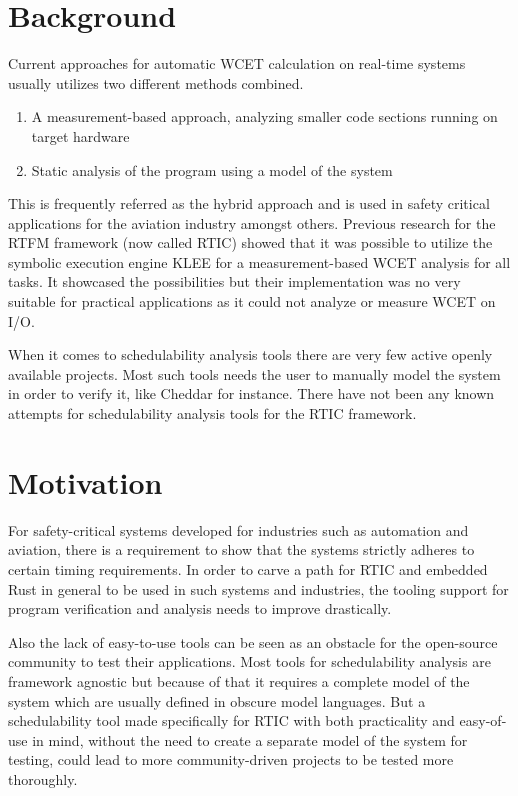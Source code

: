 \section{Background}
Current approaches for automatic WCET calculation on real-time systems usually
utilizes two different methods combined.
\begin{enumerate}
    \item A measurement-based approach, analyzing smaller code sections running
        on target hardware
    \item Static analysis of the program using a model of the system
\end{enumerate}
This is frequently referred as the hybrid approach and is used in safety
critical applications for the aviation industry\cite{rapita} amongst others.
Previous research for the RTFM framework (now called RTIC) showed that it was
possible to utilize the symbolic execution engine KLEE for a measurement-based
WCET analysis for all tasks\cite{lindner}. It showcased the possibilities but
their implementation was no very suitable for practical applications as it
could not analyze or measure WCET on I/O.

When it comes to schedulability analysis tools there are very few active openly
available projects. Most such tools needs the user to manually model the system
in order to verify it, like Cheddar\cite{cheddar} for instance. There have not
been any known attempts for schedulability analysis tools for the RTIC
framework.

\section{Motivation}
For safety-critical systems developed for industries such as automation and
aviation, there is a requirement to show that the systems strictly adheres to
certain timing requirements. In order to carve a path for RTIC and embedded
Rust in general to be used in such systems and industries, the tooling support
for program verification and analysis needs to improve drastically.

Also the lack of easy-to-use tools can be seen as an obstacle for the
open-source community to test their applications. Most tools for schedulability
analysis are framework agnostic but because of that it requires a complete
model of the system which are usually defined in obscure model languages. But a
schedulability tool made specifically for RTIC with both practicality and
easy-of-use in mind, without the need to create a separate model of the system
for testing, could lead to more community-driven projects to be tested more
thoroughly.

